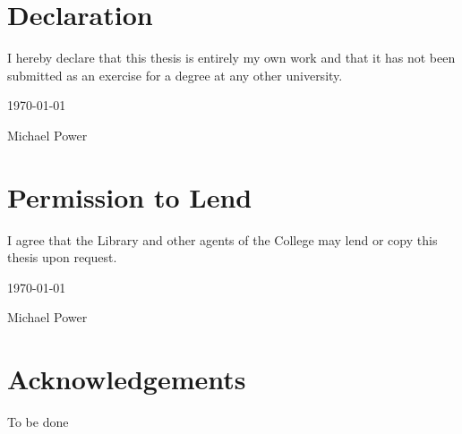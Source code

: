 \documentclass[a4wide,leqno,12pt]{report}
\begin{document}
\chapter*{Declaration}
I hereby declare that this thesis is entirely my own work and that it
has not been submitted as an exercise for a degree at any other
university.

\begin{center}
\vspace*{2in}

\underline{\hspace*{3in}} \today

Michael Power
\end{center}

\chapter*{Permission to Lend}

I agree that the Library and other agents of
the College may lend or copy this thesis upon request.

\begin{center}
\vspace*{2in}

\underline{\hspace*{3in}} \today

Michael Power


\end{center}


\chapter*{Acknowledgements}
To be done

\newpage



\pagestyle{headings}
\tableofcontents
\listoffigures
\end{document}
